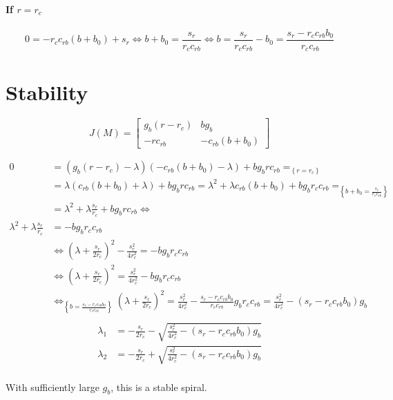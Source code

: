 \documentclass[a4paper, 12pt]{scrartcl}
\begin{document}
\paragraph{If $r = r_c$}
\[
 0 = -r_c c_{rb}\left(b + b_0\right) + s_r \Leftrightarrow b + b_0 = \frac{s_r}{r_c c_{rb}} \Leftrightarrow b =
 \frac{s_r}{r_c c_{rb}} - b_0 =  \frac{s_r - r_c c_{rb}b_0}{r_c c_{rb}}
\]

\section{Stability}
\begin{equation}
J(M) =
 \begin{bmatrix}
 g_b\left(r - r_c\right) & bg_b\\
 -rc_{rb} & -c_{rb}\left(b + b_0\right)
 \end{bmatrix}
\end{equation}

\[
\begin{aligned}
0 &= \left(g_b\left(r - r_c\right) - \lambda\right)\left(-c_{rb}\left(b + b_0\right) - \lambda\right) +bg_b r c_{rb} =_{\left\{r = r_c\right\}}\\
  &= \lambda\left(c_{rb}\left(b + b_0\right) + \lambda\right) +bg_b r c_{rb} = \lambda^2 + \lambda c_{rb}\left(b + b_0\right) + bg_b r_c c_{rb} =_{\left\{b + b_0 = \frac{s_r}{r_c c_{rb}}\right\}}\\
  &= \lambda^2 + \lambda \frac{s_r}{r_c} + bg_b r c_{rb} \Leftrightarrow \\
\lambda^2 + \lambda \frac{s_r}{r_c} &= -bg_b r_c c_{rb} \\
&\Leftrightarrow \left(\lambda + \frac{s_r}{2r_c}\right)^2 - \frac{s_r^2}{4r_c^2} = -bg_b r_c c_{rb}\\
&\Leftrightarrow \left(\lambda + \frac{s_r}{2r_c}\right)^2  = \frac{s_r^2}{4r_c^2} -bg_b r_c c_{rb}\\
&\Leftrightarrow_{\left\{b = \frac{s_r - r_c c_{rb}b_0}{r_c c_{rb}}\right\}} \left(\lambda + \frac{s_r}{2r_c}\right)^2  = \frac{s_r^2}{4r_c^2} -\frac{s_r - r_c c_{rb}b_0}{r_c c_{rb}}g_b r_c c_{rb} = \frac{s_r^2}{4r_c^2} -\left(s_r - r_c c_{rb}b_0\right)g_b \\
\end{aligned}
\]
\[
\begin{aligned}
 \lambda_1 &= -\frac{s_r}{2r_c}-\sqrt{\frac{s_r^2}{4r_c^2} - \left(s_r - r_c c_{rb}b_0\right)g_b} \\
 \lambda_2 &= -\frac{s_r}{2r_c}+\sqrt{\frac{s_r^2}{4r_c^2} - \left(s_r - r_c c_{rb}b_0\right)g_b} \\
\end{aligned}
\]

With sufficiently large $g_b$, this is a stable spiral.
\end{document}

